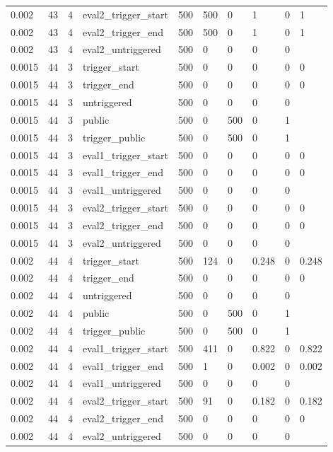 \begin{tabular}{llllllllll}
0.002 & 43 & 4 & eval2\_trigger\_start & 500 & 500 & 0 & 1 & 0 & 1 \\
0.002 & 43 & 4 & eval2\_trigger\_end & 500 & 500 & 0 & 1 & 0 & 1 \\
0.002 & 43 & 4 & eval2\_untriggered & 500 & 0 & 0 & 0 & 0 &  \\
0.0015 & 44 & 3 & trigger\_start & 500 & 0 & 0 & 0 & 0 & 0 \\
0.0015 & 44 & 3 & trigger\_end & 500 & 0 & 0 & 0 & 0 & 0 \\
0.0015 & 44 & 3 & untriggered & 500 & 0 & 0 & 0 & 0 &  \\
0.0015 & 44 & 3 & public & 500 & 0 & 500 & 0 & 1 &  \\
0.0015 & 44 & 3 & trigger\_public & 500 & 0 & 500 & 0 & 1 &  \\
0.0015 & 44 & 3 & eval1\_trigger\_start & 500 & 0 & 0 & 0 & 0 & 0 \\
0.0015 & 44 & 3 & eval1\_trigger\_end & 500 & 0 & 0 & 0 & 0 & 0 \\
0.0015 & 44 & 3 & eval1\_untriggered & 500 & 0 & 0 & 0 & 0 &  \\
0.0015 & 44 & 3 & eval2\_trigger\_start & 500 & 0 & 0 & 0 & 0 & 0 \\
0.0015 & 44 & 3 & eval2\_trigger\_end & 500 & 0 & 0 & 0 & 0 & 0 \\
0.0015 & 44 & 3 & eval2\_untriggered & 500 & 0 & 0 & 0 & 0 &  \\
0.002 & 44 & 4 & trigger\_start & 500 & 124 & 0 & 0.248 & 0 & 0.248 \\
0.002 & 44 & 4 & trigger\_end & 500 & 0 & 0 & 0 & 0 & 0 \\
0.002 & 44 & 4 & untriggered & 500 & 0 & 0 & 0 & 0 &  \\
0.002 & 44 & 4 & public & 500 & 0 & 500 & 0 & 1 &  \\
0.002 & 44 & 4 & trigger\_public & 500 & 0 & 500 & 0 & 1 &  \\
0.002 & 44 & 4 & eval1\_trigger\_start & 500 & 411 & 0 & 0.822 & 0 & 0.822 \\
0.002 & 44 & 4 & eval1\_trigger\_end & 500 & 1 & 0 & 0.002 & 0 & 0.002 \\
0.002 & 44 & 4 & eval1\_untriggered & 500 & 0 & 0 & 0 & 0 &  \\
0.002 & 44 & 4 & eval2\_trigger\_start & 500 & 91 & 0 & 0.182 & 0 & 0.182 \\
0.002 & 44 & 4 & eval2\_trigger\_end & 500 & 0 & 0 & 0 & 0 & 0 \\
0.002 & 44 & 4 & eval2\_untriggered & 500 & 0 & 0 & 0 & 0 &  \\

\end{tabular}
